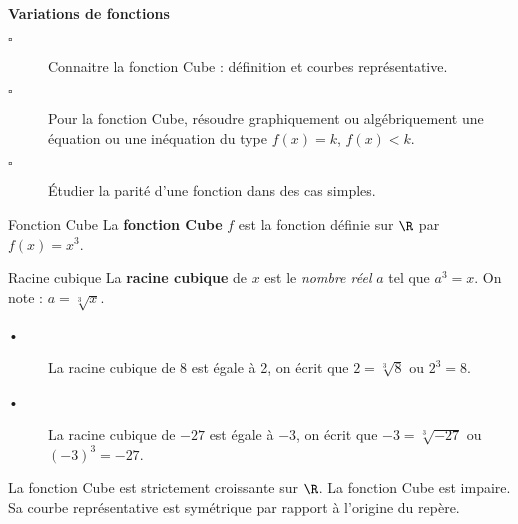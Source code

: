 \begin{titre}

\end{titre}

\begin{CpsCol}
\textbf{Variations de fonctions}
\begin{description}
\item[$\square$] Connaitre la fonction Cube : définition et courbes représentative.
\item[$\square$] Pour la fonction Cube, résoudre graphiquement ou algébriquement une équation ou une inéquation du type $f(x) = k$, $f(x) < k$.
\item[$\square$] Étudier la parité d'une fonction dans des cas simples.
\end{description}
\end{CpsCol}




\begin{DefT}{Fonction Cube}
La \textbf{fonction Cube} $f$ est la fonction définie sur $\R$ par $f(x)=x^3$.
\end{DefT}

 
\begin{DefT}{Racine cubique}
La \textbf{racine cubique} de $x$ est le \textit{nombre réel} $a$ tel que $a^3=x$. On note : $a = \sqrt[3]{x}$.
\end{DefT}

\begin{Ex}
\begin{description}
\item[•] La  racine cubique  de $8$ est égale à 2, on écrit que $2 = \sqrt[3]{8}$ ou $2^3 = 8$.
\item[•] La  racine cubique  de $-27$ est égale à $-3$, on écrit que $-3 = \sqrt[3]{-27}$ ou $(-3)^3 = -27$.
\end{description}
\end{Ex}



\begin{Pp}[Variations]
\begin{minipage}{0.48\linewidth}
La fonction Cube est strictement  croissante sur $\R$. La fonction Cube est impaire. Sa courbe représentative est symétrique par rapport à l'origine du repère.
\end{minipage}
\hfill
\begin{minipage}{0.48\linewidth}
\end{minipage}
\end{Pp}

\ROC








